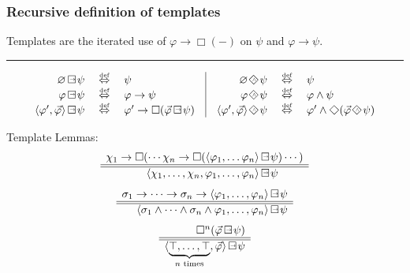 \documentclass[xcolor=x11names]{beamer}
\newcommand{\felirat}[6]{\begin{tikzpicture}[remember picture,overlay]
\node [ draw=DeepSkyBlue3,
        rectangle,
        rounded corners=#2 mm,
        inner sep=#1mm,
        ultra thick,
        fill=white,
        fill opacity=.8,
        rotate=0,
        scale=#3,
        text opacity=1]
        at ([xshift=#4 cm, yshift=#5 cm]current page.center)
        {#6};
\end{tikzpicture}}
\renewcommand{\Diamond}{\scalebox{.9}{\raisebox{-.4ex}{\rotatebox{45}{$\Box$}}}}
\newcommand{\dlrule}[3][c]{\begin{array}{#1} #2  \\  \hline\hline #3 \end{array}}
\newcommand{\defekv}[1][.1]{\hspace{#1cm}\overset{\textup{\tiny def}}{ \Leftrightarrow }\hspace{#1cm}}
\newcommand{\lthen}{\rightarrow}
\newcommand{\BoxTemplate}[1]{{#1} \mathop{\Box\hspace{-1.35ex} \raisebox{.5ex}{\scalebox{.5}{$\lthen$}}}}
\newcommand{\DiamondTemplate}[1]{#1\hspace{-.2ex} \mathop{\Diamond\hspace{-1.35ex} \raisebox{.4ex}{\scalebox{.5}{$\land$}}}\,}
\begin{document}
\begin{frame}[t]
	\frametitle{Recursive definition of templates}
\footnotesize
\begin{center}Templates are the iterated use of $\varphi \lthen \Box (-)$ on $\psi$ and $\varphi \lthen \psi$.\end{center}

\hrule

\[ \begin{array}{r|l}
   \begin{array}{rcl}
    \BoxTemplate{\varnothing}\psi &\defekv &\psi
\\  \BoxTemplate{\varphi}\psi &\defekv &\varphi \lthen \psi
\\  \BoxTemplate{\langle \varphi' , \vec \varphi\rangle}  \psi &\defekv & \varphi' \lthen  \Box (\BoxTemplate{\vec \varphi} \psi)
   \end{array} &
   \begin{array}{rcl}
    \DiamondTemplate{\varnothing}\psi &\defekv &\psi
\\  \DiamondTemplate{\varphi}\psi &\defekv &\varphi \land \psi
\\  \DiamondTemplate{\langle \varphi' , \vec \varphi\rangle}  \psi &\defekv & \varphi' \land  \Diamond (\DiamondTemplate{\vec \varphi} \psi)
   \end{array}\end{array} \]

Template Lemmas:
\[\dlrule[r]{\chi_1 \lthen \Box ( \cdots \chi_n\lthen \Box (\BoxTemplate{\langle\varphi_1, \dots \varphi_n\rangle} \psi)\cdots)}
            {\BoxTemplate{\langle \chi_1, \dots ,\chi_n,\varphi_1, \dots ,\varphi_n\rangle} \psi\qquad\;}\]
\[\dlrule[r]{\sigma_1 \lthen \cdots \lthen \sigma_n \lthen \BoxTemplate{\langle\varphi_1, \dots ,\varphi_n\rangle} \psi}
            {\BoxTemplate{\langle\sigma_1\land\cdots \land \sigma_n\land \varphi_1, \dots ,\varphi_n\rangle} \psi}\]
\[\dlrule[r]{\Box^n (\BoxTemplate{\vec\varphi} \psi)}
            {\BoxTemplate{\langle \underbrace{\top, \dots, \top}_{n \textup{ times}},\vec\varphi\rangle} \psi}\]

\end{frame}
\end{document}
